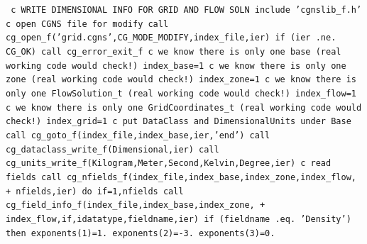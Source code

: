 \documentclass[12pt]{article}
\begin{document}
{\tt
\noindent c   WRITE DIMENSIONAL INFO FOR GRID AND FLOW SOLN
\newline\indent      include 'cgnslib\_f.h'
\newline c   open CGNS file for modify
\newline\indent      call cg\_open\_f('grid.cgns',CG\_MODE\_MODIFY,index\_file,ier)
\newline\indent      if (ier .ne. CG\_OK) call cg\_error\_exit\_f
\newline c   we know there is only one base (real working code would check!)
\newline\indent      index\_base=1
\newline c   we know there is only one zone (real working code would check!)
\newline\indent      index\_zone=1
\newline c   we know there is only one FlowSolution\_t (real working code would check!)
\newline\indent      index\_flow=1
\newline c   we know there is only one GridCoordinates\_t (real working code would check!)
\newline\indent      index\_grid=1
\newline c   put DataClass and DimensionalUnits under Base
\newline\indent      call cg\_goto\_f(index\_file,index\_base,ier,'end')
\newline\indent      call cg\_dataclass\_write\_f(Dimensional,ier)
\newline\indent      call cg\_units\_write\_f(Kilogram,Meter,Second,Kelvin,Degree,ier)
\newline c   read fields
\newline\indent      call cg\_nfields\_f(index\_file,index\_base,index\_zone,index\_flow,
\newline + \indent  nfields,ier)
\newline\indent      do if=1,nfields
\newline\indent\indent        call cg\_field\_info\_f(index\_file,index\_base,index\_zone,
\newline + \indent\indent   index\_flow,if,idatatype,fieldname,ier)
\newline\indent\indent        if (fieldname .eq. 'Density') then
\newline\indent\indent\indent          exponents(1)=1.
\newline\indent\indent\indent          exponents(2)=-3.
\newline\indent\indent\indent          exponents(3)=0.
}
\end{document}
